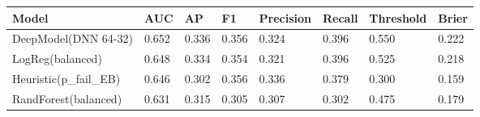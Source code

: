 \begin{table}[t]
\centering
\begin{tabular}{llllllll}
\hline
Model & AUC & AP & F1 & Precision & Recall & Threshold & Brier \\
\hline
DeepModel(DNN 64-32) & 0.652 & 0.336 & 0.356 & 0.324 & 0.396 & 0.550 & 0.222 \\
LogReg(balanced) & 0.648 & 0.334 & 0.354 & 0.321 & 0.396 & 0.525 & 0.218 \\
Heuristic(p_fail_EB) & 0.646 & 0.302 & 0.356 & 0.336 & 0.379 & 0.300 & 0.159 \\
RandForest(balanced) & 0.631 & 0.315 & 0.305 & 0.307 & 0.302 & 0.475 & 0.179 \\
\hline
\end{tabular}
\end{table}